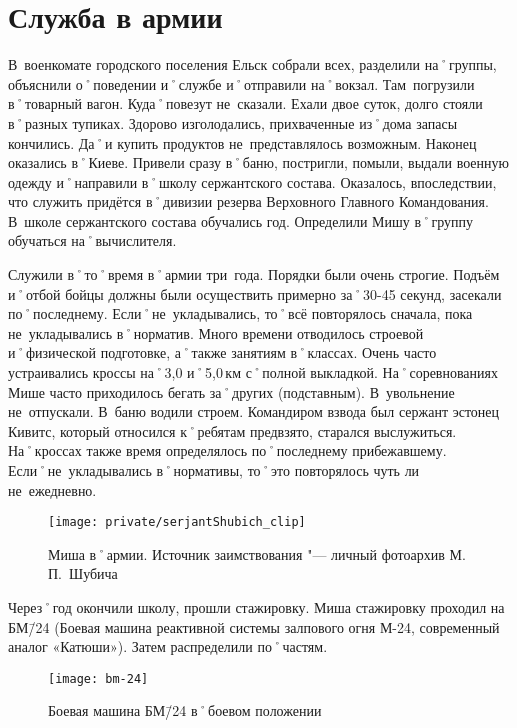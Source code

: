 ﻿\chapter{Служба в армии}
В~военкомате городского поселения Ельск собрали всех, разделили на˚группы, объяснили о˚поведении и˚службе и˚отправили на˚вокзал. Там~погрузили в˚товарный вагон. Куда˚повезут не~сказали. Ехали двое суток, долго стояли в˚разных тупиках. Здорово изголодались, прихваченные из˚дома запасы кончились. Да˚и купить продуктов не~представлялось возможным. Наконец оказались в˚Киеве. Привели сразу в˚баню, постригли, помыли, выдали военную одежду и˚направили в˚школу сержантского состава. Оказалось, впоследствии, что служить придётся в˚дивизии резерва Верховного Главного Командования. В~школе сержантского состава обучались год. Определили Мишу в˚группу обучаться на˚вычислителя.

Служили в˚то˚время в˚армии три~года. Порядки были очень строгие. Подъём и˚отбой бойцы должны были осуществить примерно за˚30-45 секунд, засекали по˚последнему. Если˚не~укладывались, то˚всё повторялось сначала, пока не~укладывались в˚норматив. Много времени отводилось строевой и˚физической подготовке, а˚также занятиям в˚классах. Очень часто устраивались кроссы на˚3,0 и˚5,0\,км с˚полной выкладкой. На˚соревнованиях Мише часто приходилось бегать за˚других (подставным). В~увольнение не~отпускали. В~баню водили строем. Командиром взвода был сержант эстонец Кивитс, который относился к˚ребятам предвзято, старался выслужиться. На˚кроссах также время определялось по˚последнему прибежавшему. Если˚не~укладывались в˚нормативы, то˚это повторялось чуть ли не~ежедневно.


\begin{figure}[H]
\texttt{[image: private/serjantShubich\_clip]}
\caption{Миша в˚армии. Источник заимствования "--- личный фотоархив М.\,П.~Шубича}
\label{fig:serjantShubich}
\end{figure}


Через˚год окончили школу, прошли стажировку. Миша стажировку проходил на БМ\=/24 (Боевая машина реактивной системы залпового огня М-24, современный аналог «Катюши»). Затем распределили по˚частям. 

\begin{wrapfigure}{O}{.4\textwidth}
\centering
\texttt{[image: bm-24]}
\caption[Боевая машина БМ\=/24 в˚боевом положении]{Боевая машина БМ\=/24 в˚боевом положении\footnotemark}
\label{fig:bm-24}
\end{wrapfigure}


